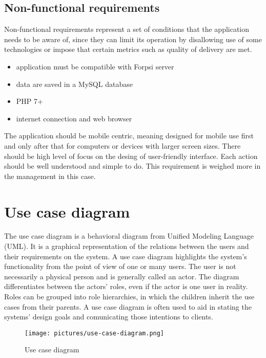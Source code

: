 \documentclass[
  digital,     %
  oneside,     %
  nosansbold,  %
  colorbold, %
  lof,         %
  lot,         %
]{fithesis4}
\begin{document}
\subsection{Non-functional requirements}

Non-functional requirements represent a set of conditions that the application needs to be aware of, since they can limit its operation by disallowing use of some technologies or impose that certain metrics such as quality of delivery are met.

\begin{itemize}
	\item application must be compatible with Forpsi server~\cite{forpsi}
	\item data are saved in a MySQL database
	\item PHP 7+
	\item internet connection and web browser
\end{itemize}

The application should be mobile centric, meaning designed for mobile use first and only after that for computers or devices with larger screen sizes. There should be high level of focus on the desing of user-friendly interface. Each action should be well understood and simple to do. This requirement is weighed more in the management in this case.

\section{Use case diagram}

The use case diagram is a behavioral diagram from Unified Modeling Language (UML). It is a graphical representation of the relations between the users and their requirements on the system. A use case diagram highlights the system's functionality from the point of view of one or many users. The user is not necessarily a physical person and is generally called an actor. The diagram differentiates between the actors' roles, even if the actor is one user in reality. Roles can be grouped into role hierarchies, in which the children inherit the use cases from their parents. A use case diagram is often used to aid in stating the systems' design goals and comunicating those intentions to clients.

\begin{figure}
	\begin{center}
		\begin{minipage}{1\textwidth}
			\texttt{[image: pictures/use-case-diagram.png]}
		\end{minipage}
	\end{center}
	\caption{Use case diagram}
	\label{fig:use-case}
\end{figure}
\end{document}
